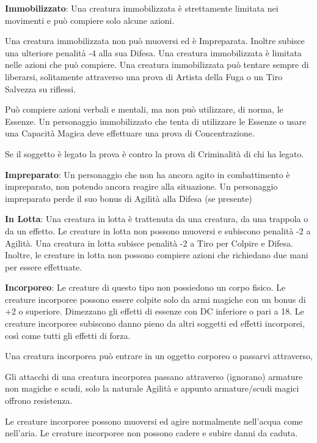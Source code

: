 \documentclass[a4paper,11pt,twoside,openany]{book}
\begin{document}
{\textbf{Immobilizzato}: Una creatura immobilizzata è strettamente limitata nei movimenti e può compiere solo alcune azioni.

Una creatura immobilizzata non può muoversi ed è Impreparata. Inoltre subisce una ulteriore penalità -4 alla sua Difesa. Una creatura immobilizzata è limitata nelle azioni che può compiere. Una creatura immobilizzata può tentare sempre di liberarsi, solitamente attraverso una prova di Artista della Fuga o un Tiro Salvezza su riflessi.

Può compiere azioni verbali e mentali, ma non può utilizzare, di norma, le Essenze. Un personaggio immobilizzato che tenta di utilizzare le Essenze o usare una Capacità Magica deve effettuare una prova di Concentrazione. 

Se il soggetto è legato la prova è contro la prova di Criminalità di chi ha legato.

\textbf{Impreparato}: Un personaggio che non ha ancora agito in combattimento è impreparato, non potendo ancora reagire alla situazione. Un personaggio impreparato perde il suo bonus di Agilità alla Difesa (se presente)

\textbf{In Lotta}: Una creatura in lotta è trattenuta da una creatura,
da una trappola o da un effetto. Le creature in lotta non possono
muoversi e subiscono penalità -2 a Agilità. Una creatura in lotta
subisce penalità -2 a Tiro per Colpire e Difesa. Inoltre, le creature
in lotta non possono compiere azioni che richiedano due mani per essere
effettuate.

\textbf{Incorporeo}: Le creature di questo tipo non possiedono un corpo fisico. Le creature incorporee possono essere colpite solo da armi magiche con un bonus di +2 o superiore. Dimezzano gli effetti di essenze con DC inferiore o pari a 18. Le creature incorporee subiscono danno pieno da altri soggetti ed effetti incorporei, così come tutti gli effetti di forza.

Una creatura incorporea può entrare in un oggetto corporeo o passarvi attraverso,

Gli attacchi di una creatura incorporea passano attraverso (ignorano) armature non magiche e scudi, solo la naturale Agilità e appunto armature/scudi magici offrono resistenza.

Le creature incorporee possono muoversi ed agire normalmente nell'acqua come nell'aria. Le creature incorporee non possono cadere e subire danni da caduta.

}
\end{document}
